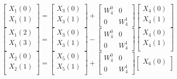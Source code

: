 \documentclass[journal,12pt,twocolumn]{IEEEtran}
\numberwithin{equation}{section}
\renewcommand\thesection{\arabic{section}}
\begin{document}
\begin{enumerate}[label=\arabic*.,ref=\thesection.\theenumi]
\begin{equation}
\begin{bmatrix}
X_{1}(0) \\ 
X_{1}(1)\\ 
\end{bmatrix}
=
\begin{bmatrix}
X_{3}(0) \\ 
X_{3}(1)\\ 
\end{bmatrix}
+
\begin{bmatrix}
W^{0}_{4} & 0\\
0 & W^{1}_{4}
\end{bmatrix}
\begin{bmatrix}
X_{4}(0) \\ 
X_{4}(1) \\ 
\end{bmatrix}
\end{equation}
\label{4to2_1}
\begin{equation}
\begin{bmatrix}
X_{1}(2) \\ 
X_{1}(3)\\ 
\end{bmatrix}
=
\begin{bmatrix}
X_{3}(0) \\ 
X_{3}(1)\\ 
\end{bmatrix}
-
\begin{bmatrix}
W^{0}_{4} & 0\\
0 & W^{1}_{4}
\end{bmatrix}
\begin{bmatrix}
X_{4}(0) \\ 
X_{4}(1) \\ 
\end{bmatrix}
\label{4to2_2}
\end{equation}
\begin{equation}
\begin{bmatrix}
X_{2}(0) \\ 
X_{2}(1)\\ 
\end{bmatrix}
=
\begin{bmatrix}
X_{5}(0) \\ 
X_{5}(1)\\ 
\end{bmatrix}
+
\begin{bmatrix}
W^{0}_{4} & 0\\
0 & W^{1}_{4}
\end{bmatrix}
\begin{bmatrix}
X_{6}(0) \\ 

\end{bmatrix}
\end{equation}
\end{enumerate}
\end{document}
